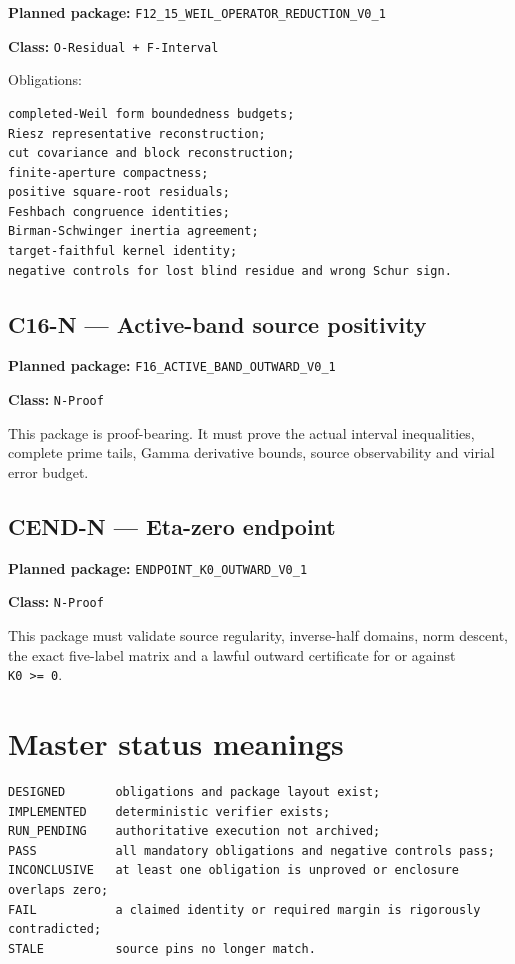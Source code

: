 \textbf{Planned package:} \texttt{F12\_15\_WEIL\_OPERATOR\_REDUCTION\_V0\_1}

\textbf{Class:} \texttt{O-Residual\ +\ F-Interval}

Obligations:

\begin{verbatim}
completed-Weil form boundedness budgets;
Riesz representative reconstruction;
cut covariance and block reconstruction;
finite-aperture compactness;
positive square-root residuals;
Feshbach congruence identities;
Birman-Schwinger inertia agreement;
target-faithful kernel identity;
negative controls for lost blind residue and wrong Schur sign.
\end{verbatim}

\hypertarget{c16-n-active-band-source-positivity}{%
\subsection{C16-N --- Active-band source positivity}\label{c16-n-active-band-source-positivity}}

\textbf{Planned package:} \texttt{F16\_ACTIVE\_BAND\_OUTWARD\_V0\_1}

\textbf{Class:} \texttt{N-Proof}

This package is proof-bearing. It must prove the actual interval inequalities, complete prime tails, Gamma derivative bounds, source observability and virial error budget.

\hypertarget{cend-n-eta-zero-endpoint}{%
\subsection{CEND-N --- Eta-zero endpoint}\label{cend-n-eta-zero-endpoint}}

\textbf{Planned package:} \texttt{ENDPOINT\_K0\_OUTWARD\_V0\_1}

\textbf{Class:} \texttt{N-Proof}

This package must validate source regularity, inverse-half domains, norm descent, the exact five-label matrix and a lawful outward certificate for or against \texttt{K0\ \textgreater{}=\ 0}.

\hypertarget{master-status-meanings}{%
\section{Master status meanings}\label{master-status-meanings}}

\begin{verbatim}
DESIGNED       obligations and package layout exist;
IMPLEMENTED    deterministic verifier exists;
RUN_PENDING    authoritative execution not archived;
PASS           all mandatory obligations and negative controls pass;
INCONCLUSIVE   at least one obligation is unproved or enclosure overlaps zero;
FAIL           a claimed identity or required margin is rigorously contradicted;
STALE          source pins no longer match.
\end{verbatim}

